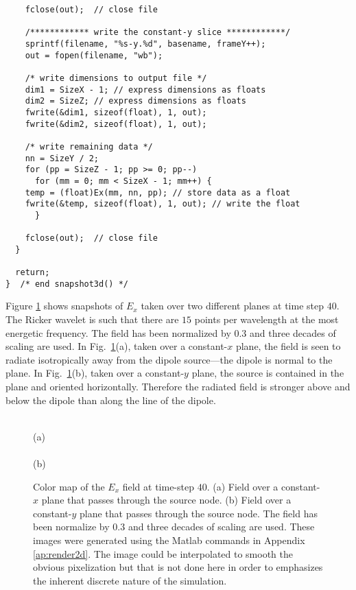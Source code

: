 \begin{program}
\begin{lstlisting}
    fclose(out);  // close file

    /************ write the constant-y slice ************/
    sprintf(filename, "%s-y.%d", basename, frameY++);
    out = fopen(filename, "wb");

    /* write dimensions to output file */
    dim1 = SizeX - 1; // express dimensions as floats
    dim2 = SizeZ; // express dimensions as floats
    fwrite(&dim1, sizeof(float), 1, out);
    fwrite(&dim2, sizeof(float), 1, out);

    /* write remaining data */
    nn = SizeY / 2;
    for (pp = SizeZ - 1; pp >= 0; pp--)
      for (mm = 0; mm < SizeX - 1; mm++) {
	temp = (float)Ex(mm, nn, pp); // store data as a float
	fwrite(&temp, sizeof(float), 1, out); // write the float
      }

    fclose(out);  // close file
  }

  return;
}  /* end snapshot3d() */
\end{lstlisting}
\end{program}

Figure \ref{fig:3dDemoResults} shows snapshots of $E_x$ taken over two
different planes at time step $40$.  The Ricker wavelet is such that
there are $15$ points per wavelength at the most energetic frequency.
The field has been normalized by $0.3$ and three decades of scaling
are used.  In Fig.\ \ref{fig:3dDemoResults}(a), taken over a
constant-$x$ plane, the field is seen to radiate isotropically away
from the dipole source---the dipole is normal to the plane.  In Fig.\
\ref{fig:3dDemoResults}(b), taken over a constant-$y$ plane, the
source is contained in the plane and oriented horizontally.  Therefore
the radiated field is stronger above and below the dipole than along
the line of the dipole.

\begin{figure}
  \begin{center}
  \\
  (a)
  \\
  \\
  (b)
  \end{center} 

  \caption{Color map of the $E_x$ field at time-step $40$.  (a) Field
  over a constant-$x$ plane that passes through the source node. (b)
  Field over a constant-$y$ plane that passes through the source
  node.  The field has been normalize by $0.3$ and three decades of
  scaling are used.  These images were generated using the Matlab
  commands in Appendix \ref{ap:render2d}.  The image could be
  interpolated to smooth the obvious pixelization but that is not done
  here in order to emphasizes the inherent discrete nature of the
  simulation.}  \label{fig:3dDemoResults}
\end{figure}

